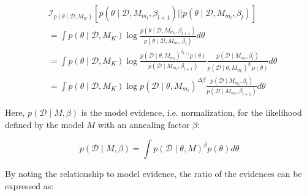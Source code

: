 \documentclass[1p]{article}
\begin{document}
\begin{equation}
\begin{split}
&\mathcal{I}_{p \left (\theta \mid \mathcal{D}, M_K \right )} \left [ p \left (\theta \mid \mathcal{D}, M_{m_l}, \beta_{l+1} \right ) || p \left (\theta \mid \mathcal{D}, M_{m_l}, \beta_l \right )\right ]\\
&=\int p \left (\theta \mid \mathcal{D}, M_K \right )\log \frac{p \left (\theta \mid \mathcal{D}, M_{m_l}, \beta_{l+1} \right )}{p \left (\theta \mid \mathcal{D}, M_{m_l}, \beta_l \right )} d\theta\\
&=\int p \left (\theta \mid \mathcal{D}, M_K \right )\log \frac{p \left (\mathcal{D} \mid \theta, M_{m_l} \right )^{\beta_{l+1}} p\left (\theta \right )}{p \left (\mathcal{D} \mid M_{m_l}, \beta_{l+1} \right )} \frac{p \left (\mathcal{D} \mid M_{m_l}, \beta_{l} \right )}{p \left (\mathcal{D} \mid \theta, M_{m_l} \right )^{\beta_l} p\left (\theta \right )} d\theta\\
&= \int p \left (\theta \mid \mathcal{D}, M_K \right )\log p \left (\mathcal{D} \mid \theta, M_{m_l} \right )^{\Delta \beta} \frac{p \left (\mathcal{D} \mid M_{m_l}, \beta_{l} \right )}{p \left (\mathcal{D} \mid M_{m_l}, \beta_{l+1} \right )} d\theta
\end{split}
\end{equation}

\noindent Here, $p \left (\mathcal{D} \mid M, \beta \right )$ is the model evidence, i.e. normalization, for the likelihood defined by the model $M$ with an annealing factor $\beta$:

\begin{equation}
p \left (\mathcal{D} \mid M, \beta \right ) = \int p \left (\mathcal{D} \mid \theta, M \right )^{\beta} p \left ( \theta \right ) d\theta
\end{equation}

\noindent By noting the relationship to model evidence, the ratio of the evidences can be expressed as:
\end{document}
